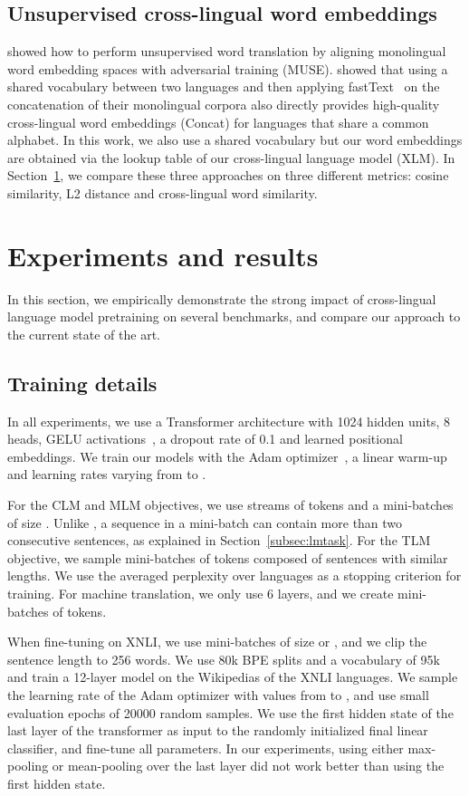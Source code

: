 \documentclass[11pt,a4paper]{article}
\begin{document}
\subsection{Unsupervised cross-lingual word embeddings}
\citet{Conneau:2018:iclr_muse} showed how to perform unsupervised word translation by aligning monolingual word embedding spaces with adversarial training (MUSE). \citet{unsupNMTlample} showed that using a shared vocabulary between two languages and then applying fastText~\cite{bojanowski2017enriching} on the concatenation of their monolingual corpora also directly provides high-quality cross-lingual word embeddings (Concat) for languages that share a common alphabet. In this work, we also use a shared vocabulary but our word embeddings are obtained via the lookup table of our cross-lingual language model (XLM). In Section~\ref{sect:exp}, we compare these three approaches on three different metrics: cosine similarity, L2 distance and cross-lingual word similarity.


\section{Experiments and results}
\label{sect:exp}
In this section, we empirically demonstrate the strong impact of cross-lingual language model pretraining on several benchmarks, and compare our approach to the current state of the art.

\subsection{Training details}
In all experiments, we use a Transformer architecture with 1024 hidden units, 8 heads, GELU activations~\cite{hendrycks2016bridging}, a dropout rate of 0.1 and learned positional embeddings. We train our models with the Adam optimizer~\cite{kingma2014adam}, a linear warm-up~\cite{transformer17} and learning rates varying from  to .

For the CLM and MLM objectives, we use streams of  tokens and a mini-batches of size . Unlike \citet{devlin2018bert}, a sequence in a mini-batch can contain more than two consecutive sentences, as explained in Section~\ref{subsec:lmtask}.
For the TLM objective, we sample mini-batches of  tokens composed of sentences with similar lengths. We use the averaged perplexity over languages as a stopping criterion for training. For machine translation, we only use 6 layers, and we create mini-batches of  tokens.

When fine-tuning on XNLI, we use mini-batches of size  or , and we clip the sentence length to 256 words. We use 80k BPE splits and a vocabulary of 95k and train a 12-layer model on the Wikipedias of the XNLI languages. We sample the learning rate of the Adam optimizer with values from  to , and use small evaluation epochs of 20000 random samples. We use the first hidden state of the last layer of the transformer as input to the randomly initialized final linear classifier, and fine-tune all parameters. In our experiments, using either max-pooling or mean-pooling over the last layer did not work better than using the first hidden state.
\end{document}
